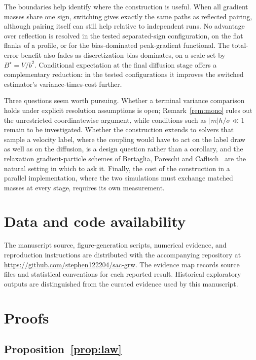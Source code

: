 \documentclass[smallextended,nospthms]{svjour3}
\theoremstyle{plain}
\theoremstyle{definition}
\theoremstyle{remark}
\numberwithin{equation}{section}
\begin{document}
The boundaries help identify where the construction is useful. When all
gradient masses share one sign, switching gives exactly the same paths as
reflected pairing, although pairing itself can still help relative to
independent runs. No advantage over reflection is resolved in the tested
separated-sign configuration, on the flat flanks of a profile, or for the
bias-dominated peak-gradient functional. The total-error benefit also fades
as discretization bias dominates, on a scale set by $B^\star=V/b^2$.
Conditional expectation at the final diffusion stage offers a complementary
reduction: in the tested configurations it improves the switched estimator's
variance-times-cost further.

Three questions seem worth pursuing. Whether a terminal variance comparison
holds under explicit resolution assumptions is open; Remark~\ref{rem:mono}
rules out the unrestricted coordinatewise argument, while conditions such as
$|m|h/\sigma\ll1$ remain to be investigated. Whether the construction extends to solvers
that sample a velocity label, where the coupling would have to act on the label
draw as well as on the diffusion, is a design question rather than a corollary,
and the relaxation gradient-particle schemes of Bertaglia, Pareschi and
Caflisch~\citep{bertaglia2024} are the natural setting in which to ask it.
Finally, the cost of the construction in a parallel implementation, where the
two simulations must exchange matched masses at every stage, requires its own
measurement.
\section*{Data and code availability}

The manuscript source, figure-generation scripts, numerical evidence, and
reproduction instructions are distributed with the accompanying repository at
\url{https://github.com/stephen122204/sac-grw}.
The evidence map records source files and statistical conventions for each
reported result. Historical exploratory outputs are distinguished from the
curated evidence used by this manuscript.


\appendix
\section{Proofs}
\label{app:proofs}

\subsection{Proposition~\ref{prop:law}}
\end{document}
